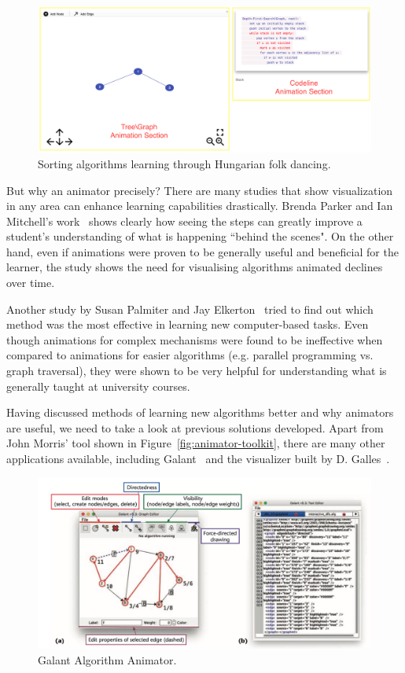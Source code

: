 \documentclass{l4proj}
\begin{document}
\begin{figure}[!ht]
\centering
\includegraphics[scale=0.3]{animation-panes}
\caption{Sorting algorithms learning through Hungarian folk dancing.}
\label{fig:animation-panes}
\end{figure}

But why an animator precisely? There are many studies that show visualization in any area can enhance learning
capabilities drastically. Brenda Parker and Ian Mitchell's work~\cite{parker-mitchell} shows clearly how seeing the
steps can greatly improve a student's understanding of what is happening ``behind the scenes". On the other hand, even if animations were proven to be generally useful and beneficial for the learner, the study shows the need for visualising algorithms animated declines over time.

Another study by Susan Palmiter and Jay Elkerton~\cite{palmiter-elkerton} tried to find out which method was the most
effective in learning new computer-based tasks. Even though animations for complex mechanisms were found to be
ineffective when compared to animations for easier algorithms (e.g. parallel programming vs. graph traversal), they were shown to be very helpful
for understanding what is generally taught at university courses.

Having discussed methods of learning new algorithms better and why animators are useful, we need to take a look at
previous solutions developed. Apart from John Morris' tool shown in Figure~\ref{fig:animator-toolkit}, there are many other applications available, including Galant~\cite{galant} and the visualizer built by D. Galles~\cite{galles}.

\begin{figure}[!ht]
\centering
\includegraphics[scale=0.4]{galant}
\caption{Galant Algorithm Animator.}
\label{fig:galant}
\end{figure}
\end{document}
